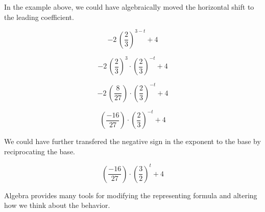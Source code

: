 \documentclass{ximera}
\begin{document}
In the example above, we could have algebraically moved the horizontal shift to the leading coefficient.



\[
-2 \, \left( \frac{2}{3} \right)^{3-t} + 4
\]


\[
-2 \, \left( \frac{2}{3} \right)^{3} \cdot \left( \frac{2}{3} \right)^{-t}+ 4
\]


\[
-2 \, \left( \frac{8}{27} \right)  \cdot \left( \frac{2}{3} \right)^{-t}+ 4
\]


\[
\left( \frac{-16}{27} \right)  \cdot \left( \frac{2}{3} \right)^{-t}+ 4
\]


We could have further transfered the negative sign in the exponent to the base by reciprocating the base.

\[
\left( \frac{-16}{27} \right)  \cdot \left( \frac{3}{2} \right)^t+ 4
\]



Algebra provides many tools for modifying the representing formula and altering how we think about the behavior. \\
\end{document}
